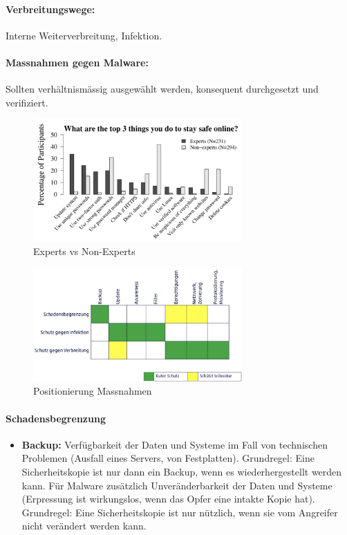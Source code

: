 \documentclass[10pt,a4paper]{article}
\begin{document}
\paragraph*{Verbreitungswege:} Interne Weiterverbreitung, Infektion.
\paragraph*{Massnahmen gegen Malware:} Sollten verhältnismässig ausgewählt werden, konsequent durchgesetzt und verifiziert.
\begin{figure}[H]
    \begin{center}
    \includegraphics[width=8cm]{images/expertvsnonexpert.png}
    \caption{Experts vs Non-Experts}
    \label{expertvsnonexpert}
    \end{center}
\end{figure}
\begin{figure}[H]
    \begin{center}
    \includegraphics[width=8cm]{images/massnahmenpost.png}
    \caption{Positionierung Massnahmen}
    \label{massnahmenpost}
    \end{center}
\end{figure}
\paragraph*{Schadensbegrenzung}
\begin{itemize}[noitemsep,topsep=0pt,leftmargin=*]
	\item \textbf{Backup:} Verfügbarkeit der Daten und Systeme im Fall von technischen Problemen (Ausfall eines Servers, von Festplatten). Grundregel: Eine Sicherheitskopie ist nur dann ein Backup, wenn es wiederhergestellt werden kann. Für Malware zusätzlich Unveränderbarkeit der Daten und Systeme (Erpressung ist wirkungslos, wenn das Opfer eine intakte Kopie hat). Grundregel: Eine Sicherheitskopie ist nur nützlich, wenn sie vom Angreifer nicht verändert werden kann.
\end{itemize}
\end{document}

